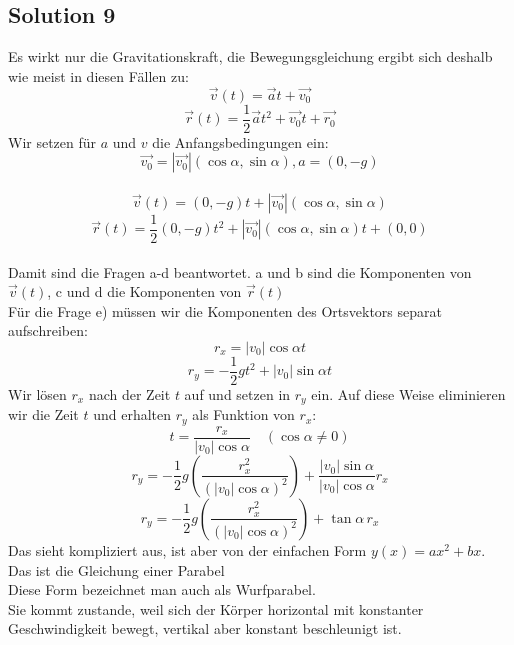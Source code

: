 \documentclass{article}
\begin{document}
\subsection*{Solution 9}
Es wirkt nur die Gravitationskraft, die Bewegungsgleichung ergibt sich deshalb wie meist in diesen Fällen zu:
\[\vec{v}(t)=\vec{a}t+\vec{v_0}\]
\[\vec{r}(t)=\frac{1}{2}\vec{a}t^2+\vec{v_0}t+\vec{r_0}\]
Wir setzen für $a$ und $v$ die Anfangsbedingungen ein:
\[\vec{v_0}=|\vec{v_0}|(\cos\alpha,\sin\alpha) \mathrm{,}a=(0,-g)\] \\
\[\vec{v}(t)=(0,-g)t+|\vec{v_0}|(\cos\alpha,\sin\alpha)\]
\[\vec{r}(t)=\frac{1}{2}(0,-g)t^2+|\vec{v_0}|(\cos\alpha,\sin\alpha)t+(0,0)\]\\
Damit sind die Fragen a-d beantwortet. a und b sind die Komponenten von $\vec{v}(t)$, c und d die Komponenten von $\vec{r}(t)$\\
Für die Frage e) müssen wir die Komponenten des Ortsvektors separat aufschreiben:
\[
r_x = |v_0| \cos \alpha t
\]
\[
r_y = -\frac{1}{2} g t^2 + |v_0| \sin \alpha t
\]
Wir lösen $r_x$ nach der Zeit $t$ auf und setzen in $r_y$ ein. Auf diese Weise eliminieren wir die Zeit $t$ und erhalten $r_y$ als Funktion von $r_x$:
\[
t = \frac{r_x}{|v_0| \cos \alpha} \quad (\cos \alpha \neq 0)
\]
\[
r_y = -\frac{1}{2} g \left( \frac{r_x^2}{(|v_0| \cos \alpha)^2} \right) + \frac{|v_0| \sin \alpha}{|v_0| \cos \alpha} r_x
\]
\[
r_y = -\frac{1}{2} g \left( \frac{r_x^2}{(|v_0| \cos \alpha)^2} \right) + \tan \alpha \, r_x
\]
Das sieht kompliziert aus, ist aber von der einfachen Form $y(x)=ax^2+bx.$ Das ist die Gleichung einer Parabel\\
Diese Form bezeichnet man auch als Wurfparabel.\\
Sie kommt zustande, weil sich der Körper horizontal mit konstanter Geschwindigkeit bewegt, vertikal aber konstant beschleunigt ist.
\end{document}
